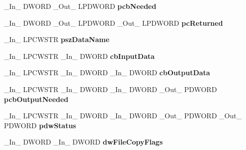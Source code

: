 \begin{DoxyCompactItemize}
\+\_\+\+In\+\_\+ D\+W\+O\+RD \+\_\+\+Out\+\_\+ L\+P\+D\+W\+O\+RD {\bfseries pcb\+Needed}
\item 
\mbox{\label{struct___p_r_i_n_t_p_r_o_v_i_d_o_r_afb16d1b391fdd5ed50ea9da9ebde5ecb}} 
\+\_\+\+In\+\_\+ D\+W\+O\+RD \+\_\+\+Out\+\_\+ L\+P\+D\+W\+O\+RD \+\_\+\+Out\+\_\+ L\+P\+D\+W\+O\+RD {\bfseries pc\+Returned}
\item 
\mbox{\label{struct___p_r_i_n_t_p_r_o_v_i_d_o_r_ab67da9ba3ba12f364af05f745f534bad}} 
\+\_\+\+In\+\_\+ L\+P\+C\+W\+S\+TR {\bfseries psz\+Data\+Name}
\item 
\mbox{\label{struct___p_r_i_n_t_p_r_o_v_i_d_o_r_a29e405dbea463d2a4949e46665c8864c}} 
\+\_\+\+In\+\_\+ L\+P\+C\+W\+S\+TR \+\_\+\+In\+\_\+ D\+W\+O\+RD {\bfseries cb\+Input\+Data}
\item 
\mbox{\label{struct___p_r_i_n_t_p_r_o_v_i_d_o_r_a789723f4054d02c1987e010710b454ee}} 
\+\_\+\+In\+\_\+ L\+P\+C\+W\+S\+TR \+\_\+\+In\+\_\+ D\+W\+O\+RD \+\_\+\+In\+\_\+ D\+W\+O\+RD {\bfseries cb\+Output\+Data}
\item 
\mbox{\label{struct___p_r_i_n_t_p_r_o_v_i_d_o_r_acea955381f00ef9d3dc39166c22b9dff}} 
\+\_\+\+In\+\_\+ L\+P\+C\+W\+S\+TR \+\_\+\+In\+\_\+ D\+W\+O\+RD \+\_\+\+In\+\_\+ D\+W\+O\+RD \+\_\+\+Out\+\_\+ P\+D\+W\+O\+RD {\bfseries pcb\+Output\+Needed}
\item 
\mbox{\label{struct___p_r_i_n_t_p_r_o_v_i_d_o_r_a0fc8549c54aade2d1d197bf3b3e4fb7f}} 
\+\_\+\+In\+\_\+ L\+P\+C\+W\+S\+TR \+\_\+\+In\+\_\+ D\+W\+O\+RD \+\_\+\+In\+\_\+ D\+W\+O\+RD \+\_\+\+Out\+\_\+ P\+D\+W\+O\+RD \+\_\+\+Out\+\_\+ P\+D\+W\+O\+RD {\bfseries pdw\+Status}
\item 
\mbox{\label{struct___p_r_i_n_t_p_r_o_v_i_d_o_r_a585a61081891b8be4b8baf7ba50c7bea}} 
\+\_\+\+In\+\_\+ D\+W\+O\+RD \+\_\+\+In\+\_\+ D\+W\+O\+RD {\bfseries dw\+File\+Copy\+Flags}
\item 
\mbox{\label{struct___p_r_i_n_t_p_r_o_v_i_d_o_r_afdb1b5f4df21d03144b0ee08ae59e362}} 

\end{DoxyCompactItemize}
